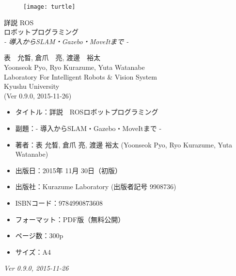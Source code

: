 \documentclass[11pt,fleqn]{book} %
\begin{document}
\begingroup
\thispagestyle{empty}
\centering
\vspace*{3cm}

\begin{figure}[htp]
\centering\hspace{30pt}\texttt{[image: turtle]}
\end{figure}

\vspace*{1cm}
\par\normalfont\fontsize{35}{35}\sffamily\selectfont
詳説 ROS\\%
ロボットプログラミング\\%
{\LARGE \textit{- 導入からSLAM・Gazebo・MoveItまで -}}\par
\vspace*{5cm}
{\Large 表　允晳, 倉爪　亮, 渡邊　裕太}\\
\vspace*{-0.5cm}
{\Large Yoonseok Pyo, Ryo Kurazume, Yuta Watanabe}\\
\vspace*{1cm}
{\Large Laboratory For Intelligent Robots \& Vision System\\Kyushu University}\\
\vspace*{2cm}
{\large (Ver 0.9.0, 2015-11-26)}\\ %
\endgroup

\newpage
\thispagestyle{empty}

\begin{itemize}[leftmargin=*]
\item タイトル：詳説　ROSロボットプログラミング
\item 副題：- 導入からSLAM・Gazebo・MoveItまで -
\item 著者：表 允晳, 倉爪 亮, 渡邊 裕太 (Yoonseok Pyo, Ryo Kurazume, Yuta Watanabe)
\item 出版日：2015年 11月 30日（初版）
\item 出版社：Kurazume Laboratory (出版者記号 9908736)
\item ISBNコード：9784990873608
\item フォーマット：PDF版（無料公開）
\item ページ数：300p
\item サイズ：A4
\end{itemize}
\vspace*{1cm}
\textit{Ver 0.9.0, 2015-11-26}\\ %
\end{document}
